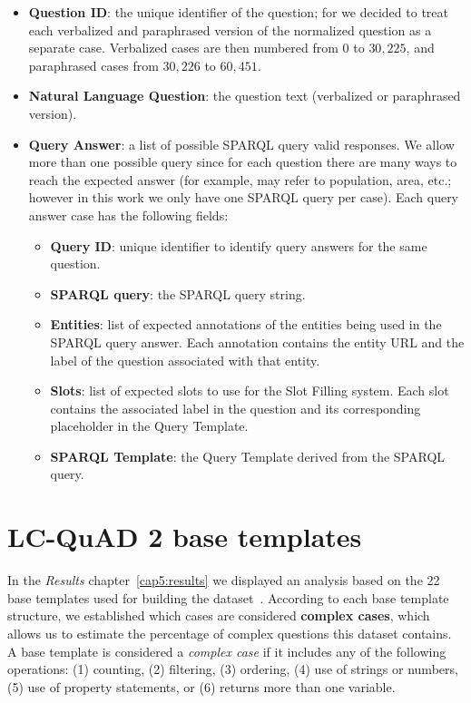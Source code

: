 \begin{itemize}
    \item \textbf{Question ID}: the unique identifier of the question; for \LCQuADtwo{} we decided to 
    treat each verbalized and paraphrased version of the normalized question as a separate case. 
    Verbalized cases are then numbered from $0$ to $30,225$, and paraphrased cases from $30,226$ to 
    $60,451$.
    \item \textbf{Natural Language Question}: the question text (verbalized or paraphrased version).
    \item \textbf{Query Answer}: a list of possible SPARQL query valid responses. We allow more than 
    one possible query since for each question there are many ways to reach the expected answer (for 
    example,  may refer to population, area, etc.; however in 
    this work we only have one SPARQL query per case). Each query answer case has the following fields:
    \begin{itemize}
        \item \textbf{Query ID}: unique identifier to identify query answers for the same question.
        \item \textbf{SPARQL query}: the SPARQL query string.
        \item \textbf{Entities}: list of expected annotations of the entities being used in the 
        SPARQL query answer. Each annotation contains the entity URL and the label of the question 
        associated with that entity.
        \item \textbf{Slots}: list of expected slots to use for the Slot Filling system. Each slot 
        contains the associated label in the question and its corresponding placeholder in the Query 
        Template.
        \item \textbf{SPARQL Template}: the Query Template derived from the SPARQL query.
    \end{itemize}
\end{itemize}

\section{LC-QuAD 2 base templates}
\label{appendix:qaDataset/baseTemplates}
In the \textit{Results} chapter~\ref{cap5:results} we displayed an analysis based on the 22 base 
templates used for building 
the \LCQuADtwo{} dataset~\cite{dataset:lcquad2-DubeyBA019}. According to each base template structure, 
we established which cases are considered \textbf{complex cases}, which allows us to estimate the 
percentage of complex questions this dataset contains. A base template is considered a \textit{complex 
case} if it includes any of the following operations: (1) counting, (2) filtering, (3) ordering, 
(4) use of strings or numbers,(5) use of property statements, or (6) returns more than one variable. 

